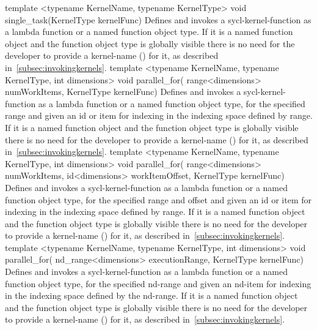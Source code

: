    \addRowTwoL
    {template <typename KernelName, typename KernelType>}
    {void single_task(KernelType kernelFunc)}
    {
      Defines and invokes a \gls{sycl-kernel-function} as a lambda function
      or a named function object type.
      If it is a named function object and the function object type is globally
      visible there is no need for the developer
      to provide a \gls{kernel-name} () for it,
      as described in~\ref{subsec:invokingkernels}.
    }
   \addRowThreeL
    {template <typename KernelName, typename KernelType, int dimensions>}
    {void parallel_for(}
    {range<dimensions> numWorkItems, KernelType kernelFunc)}
    {
      Defines and invokes a \gls{sycl-kernel-function} as a lambda function
      or a named function object type,
      for the specified range and given an id or item for indexing in the
      indexing space defined by range.
      If it is a named function object and the function object type is globally
      visible there is no need for the developer
      to provide a \gls{kernel-name} () for it,
      as described in~\ref{subsec:invokingkernels}.
    }
    \addRowFourL
    {template <typename KernelName, typename KernelType, int dimensions>}
    {void parallel_for(}
    { range<dimensions> numWorkItems,}
    { id<dimensions> workItemOffset, KernelType kernelFunc)}
    {
      Defines and invokes a \gls{sycl-kernel-function} as a lambda function
      or a named function object type,
      for the specified range and offset and given an id or item for indexing in
      the indexing space defined by range.
      If it is a named function object and the function object type is globally
      visible there is no need for the developer
      to provide a \gls{kernel-name} () for it,
      as described in~\ref{subsec:invokingkernels}.
    }
  \addRowThreeL
    {template <typename KernelName, typename KernelType, int dimensions>}
    {void parallel_for(}
    {nd_range<dimensions> executionRange, KernelType kernelFunc)}
    {
      Defines and invokes a \gls{sycl-kernel-function} as a lambda function
      or a named function object type,
      for the specified \gls{nd-range} and given an \gls{nd-item}
      for indexing in the indexing space defined by the \gls{nd-range}.
      If it is a named function object and the function object type is globally
      visible there is no need for the developer
      to provide a \gls{kernel-name} () for it,
      as described in~\ref{subsec:invokingkernels}.
    }
